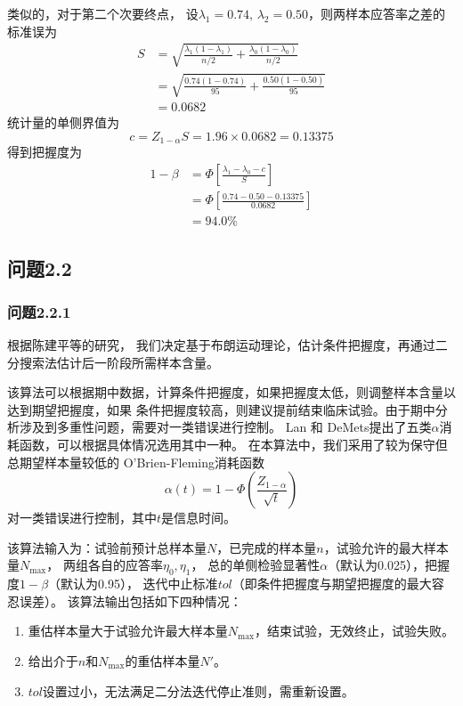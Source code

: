\documentclass{article}
\begin{document}
类似的，对于第二个次要终点，
设$\lambda_1=0.74,\, \lambda_2=0.50$，则两样本应答率之差的标准误为
\begin{align*}
    S &= \sqrt{\frac{\lambda_1(1-\lambda_1)}{n/2}+\frac{\lambda_0(1-\lambda_0)}{n/2}}\\
    &= \sqrt{\frac{0.74(1-0.74)}{95}+\frac{0.50(1-0.50)}{95}}\\
    &=0.0682
\end{align*}
统计量的单侧界值为
\[c=Z_{1-\alpha}S=1.96\times0.0682=0.13375\]
得到把握度为
\begin{align*}
    1-\beta &= \varPhi \left[\frac{\lambda_1-\lambda_0-c}{S}\right] \\
            &= \varPhi \left[\frac{0.74-0.50-0.13375}{0.0682}\right] \\
            & = 94.0\%
\end{align*}

\subsection{问题2.2}
\subsubsection{问题2.2.1}
根据陈建平等的研究\cite{陈建平2010期中分析的条件把握度及样本含量再估计}，
我们决定基于布朗运动理论，估计条件把握度，再通过二分搜索法估计后一阶段所需样本含量。

该算法可以根据期中数据，计算条件把握度，如果把握度太低，则调整样本含量以达到期望把握度，如果
条件把握度较高，则建议提前结束临床试验。由于期中分析涉及到多重性问题，需要对一类错误进行控制。
Lan 和 DeMets提出了五类$\alpha$消耗函数\cite{陈峰2018临床试验统计学}，可以根据具体情况选用其中一种。
在本算法中，我们采用了较为保守但总期望样本量较低的
O'Brien-Fleming消耗函数
\[\alpha(t)=1-\Phi(\frac{Z_{1-\alpha}}{\sqrt{t}})\]
对一类错误进行控制，其中$t$是信息时间。

该算法输入为：试验前预计总样本量$N$，已完成的样本量$n$，试验允许的最大样本量$N_{\text{max}}$，
两组各自的应答率$\eta_0,\eta_1$，
总的单侧检验显著性$\alpha$（默认为0.025），把握度$1-\beta$（默认为0.95），
迭代中止标准$tol$（即条件把握度与期望把握度的最大容忍误差）。
该算法输出包括如下四种情况：
\begin{enumerate}
    \item 重估样本量大于试验允许最大样本量$N_{\text{max}}$，结束试验，无效终止，试验失败。
    \item 给出介于$n$和$N_{\text{max}}$的重估样本量$N'$。
    \item $tol$设置过小，无法满足二分法迭代停止准则，需重新设置。
\end{enumerate}
\end{document}
